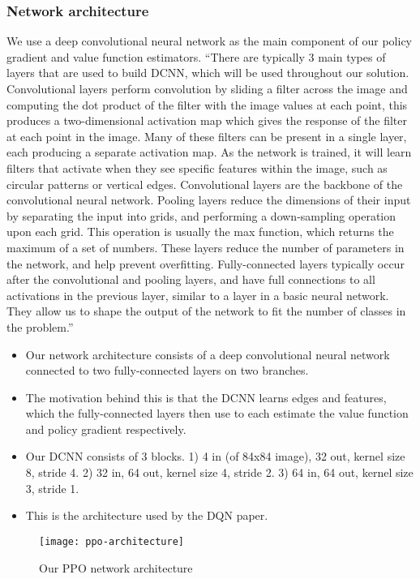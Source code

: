 \documentclass[12pt,a4paper]{article}
\begin{document}
\subsubsection{Network architecture}
We use a deep convolutional neural network as the main component of our policy gradient and value function estimators. ``There are typically 3 main types of layers that are used to build DCNN, which will be
used throughout our solution. Convolutional layers perform convolution by sliding a filter
across the image and computing the dot product of the filter with the image values at each
point, this produces a two-dimensional activation map which gives the response of the filter
at each point in the image. Many of these filters can be present in a single layer, each
producing a separate activation map. As the network is trained, it will learn filters that
activate when they see specific features within the image, such as circular patterns or vertical
edges. Convolutional layers are the backbone of the convolutional neural network. Pooling
layers reduce the dimensions of their input by separating the input into grids, and performing
a down-sampling operation upon each grid. This operation is usually the max function, which
returns the maximum of a set of numbers. These layers reduce the number of parameters in
the network, and help prevent overfitting. Fully-connected layers typically occur after the
convolutional and pooling layers, and have full connections to all activations in the previous
layer, similar to a layer in a basic neural network. They allow us to shape the output of the
network to fit the number of classes in the problem.''

\begin{itemize}
    \item Our network architecture consists of a deep convolutional neural network connected to two fully-connected layers on two branches. 
    \item The motivation behind this is that the DCNN learns edges and features, which the fully-connected layers then use to each estimate the value function and policy gradient respectively.
    \item Our DCNN consists of 3 blocks. 1) 4 in (of 84x84 image), 32 out, kernel size 8, stride 4. 2) 32 in, 64 out, kernel size 4, stride 2. 3) 64 in, 64 out, kernel size 3, stride 1.
    \item This is the architecture used by the DQN paper.
\end{itemize}

\begin{figure}[h]
\centering
\texttt{[image: ppo-architecture]}
\caption{Our PPO network architecture}
\end{figure}
    
\end{document}
